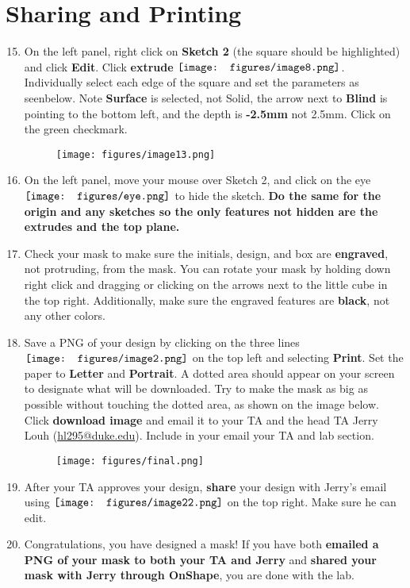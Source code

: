 \documentclass[12pt]{../manual}
\begin{document}
\section{Sharing and Printing}
\begin{enumerate}
\setcounter{enumi}{14}
\item On the left panel, right click on {\bf Sketch 2} (the square should be highlighted) and click {\bf Edit}. Click {\bf extrude} $\vcenter{\hbox{\texttt{[image: figures/image8.png]}}}$. Individually select each edge of the square and set the parameters as seenbelow. Note {\bf Surface} is selected, not Solid, the arrow next to {\bf Blind} is pointing to the bottom left, and the depth is {\bf-2.5mm} not 2.5mm. Click on the green checkmark.
\begin{figure}[ht!]
\centering
\texttt{[image: figures/image13.png]}
\end{figure}
\item On the left panel, move your mouse over Sketch 2, and click on the eye $\vcenter{\hbox{\texttt{[image: figures/eye.png]}}}$ to hide the sketch. {\bf Do the same for the origin and any sketches so the only features not hidden are the extrudes and the top plane.}
\item Check your mask to make sure the initials, design, and box are {\bf engraved}, not protruding, from the mask. You can rotate your mask by holding down right click and dragging or clicking on the arrows next to the little cube in the top right. Additionally, make sure the engraved features are {\bf black}, not any other colors.
\newpage
\item Save a PNG of your design by clicking on the three lines $\vcenter{\hbox{\texttt{[image: figures/image2.png]}}}$  on the top left and selecting {\bf Print}. Set the paper to {\bf Letter} and {\bf Portrait}. A dotted area should appear on your screen to designate what will be downloaded. Try to make the mask as big as possible without touching the dotted area, as shown on the image below. Click {\bf download image} and email it to your TA and the head TA Jerry Louh (\href{hl295@duke.edu}{hl295@duke.edu}). Include in your email your TA and lab section.
\begin{figure}[ht!]
\centering
\texttt{[image: figures/final.png]}
\end{figure}
\item After your TA approves your design, {\bf share} your design with Jerry's email using $\vcenter{\hbox{\texttt{[image: figures/image22.png]}}}$ on the top right. Make sure he can edit. 
\item Congratulations, you have designed a mask! If you have both {\bf emailed a PNG of your mask to both your TA and Jerry} and {\bf shared your mask with Jerry through OnShape}, you are done with the lab. 
\end{enumerate}
\end{document}
